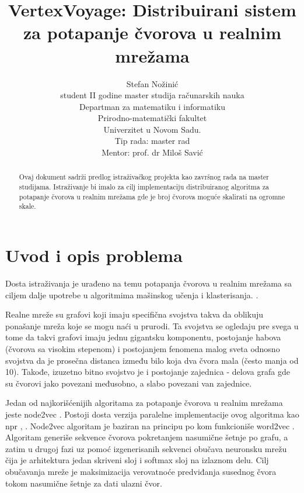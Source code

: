 \documentclass[]{amsart}
\begin{document}
\title{VertexVoyage: Distribuirani sistem za potapanje čvorova u realnim mrežama}
\author{Stefan Nožinić \\
student II godine master studija računarskih nauka \\
Departman za matematiku i informatiku \\
Prirodno-matematički fakultet \\
Univerzitet u Novom Sadu. \\
Tip rada: master rad \\
Mentor: \MakeLowercase{prof. dr} Miloš Savić
}

\begin{abstract}
    Ovaj dokument sadrži predlog istraživačkog projekta kao završnog rada na master studijama.
    Istraživanje bi imalo za cilj implementaciju distribuiranog algoritma za potapanje čvorova u realnim mrežama gde je broj čvorova moguće skalirati na ogromne skale.
\end{abstract}


\maketitle
\newpage


\section{Uvod i opis problema}
\label{sec:introduction}

Dosta istraživanja je urađeno na temu potapanja čvorova u realnim mrežama 
sa ciljem dalje upotrebe u algoritmima mašinskog učenja i klasterisanja. \cite{grover2016node2vec}.

Realne mreže su grafovi koji imaju specifična svojstva takva da oblikuju ponašanje mreža koje se mogu naći u prurodi. Ta svojstva se ogledaju pre svega u tome da takvi grafovi imaju jednu gigantsku komponentu, postojanje habova (čvorova sa visokim stepenom) i postojanjem fenomena malog sveta odnosno svojstva da je prosečna distanca između bilo koja dva čvora mala (često manja od 10). Takođe, izuzetno bitno svojstvo je i postojanje zajednica - delova grafa gde su čvorovi jako povezani međusobno, a slabo povezani van zajednice. 

Jedan od najkorišćenijih algoritama za potapanje čvorova u realnim mrežama jeste node2vec \cite{grover2016node2vec}. Postoji dosta verzija paralelne implementacije ovog algoritma kao npr \cite{lombardo2019actornode2vec}, \cite{fang2023distributed}. Node2vec algoritam je baziran na principu po kom funkcioniše word2vec \cite{church2017word2vec}. Algoritam generiše sekvence čvorova pokretanjem nasumične šetnje po grafu, a zatim u drugoj fazi uz pomoć izgenerisanih sekvenci obučava neuronsku mrežu čija je arhitektura jedan skriveni sloj i softmax sloj na izlaznom delu. Cilj obučavanja mreže je maksimizacija verovatnoće predviđanja susednog čvora tokom nasumične šetnje za dati ulazni čvor. 
\end{document}

